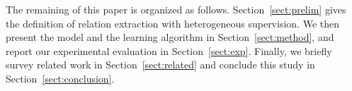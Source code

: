 The remaining of this paper is organized as follows. 
Section~\ref{sect:prelim} gives the definition of relation extraction with heterogeneous supervision. 
We then present the \our model and the learning algorithm in Section~\ref{sect:method}, and report our experimental evaluation in Section~\ref{sect:exp}.
Finally, we briefly survey related work in Section~\ref{sect:related} and conclude this study in Section~\ref{sect:conclusion}. 